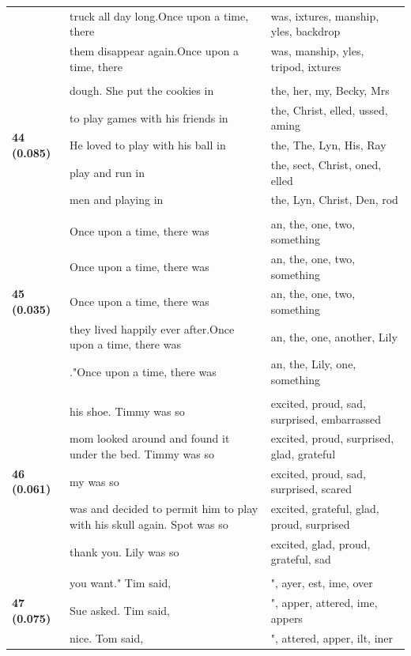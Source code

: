 \documentclass{article}
\theoremstyle{plain}
\theoremstyle{definition}
\theoremstyle{remark}
\begin{document}
\begin{longtable}{|p{}|p{}|p{}|}
& truck all day long.Once upon a time, there & was, ixtures, manship, yles,  backdrop \\
& them disappear again.Once upon a time, there & was, manship, yles,  tripod, ixtures \\
& & \\
\multirow{5}{*}{\textbf{44 (0.085)}} & dough. She put the cookies in & the,  her,  my,  Becky,  Mrs \\
& to play games with his friends in & the, Christ, elled, ussed, aming \\
& He loved to play with his ball in & the, The,  Lyn, His, Ray \\
& play and run in & the, sect, Christ, oned, elled \\
& men and playing in & the,  Lyn, Christ, Den, rod \\
& & \\
\multirow{5}{*}{\textbf{45 (0.035)}} & Once upon a time, there was & an,  the,  one,  two,  something \\
& Once upon a time, there was & an,  the,  one,  two,  something \\
& Once upon a time, there was & an,  the,  one,  two,  something \\
& they lived happily ever after.Once upon a time, there was & an,  the,  one,  another,  Lily \\
& ."Once upon a time, there was & an,  the,  Lily,  one,  something \\
& & \\
\multirow{5}{*}{\textbf{46 (0.061)}} & his shoe. Timmy was so & excited,  proud,  sad,  surprised,  embarrassed \\
& mom looked around and found it under the bed. Timmy was so & excited,  proud,  surprised,  glad,  grateful \\
& my was so & excited,  proud,  sad,  surprised,  scared \\
& was and decided to permit him to play with his skull again. Spot was so & excited,  grateful,  glad,  proud,  surprised \\
& thank you. Lily was so & excited,  glad,  proud,  grateful,  sad \\
& & \\
\multirow{5}{*}{\textbf{47 (0.075)}} & you want." Tim said, & ", ayer, est, ime, over \\
& Sue asked. Tim said, & ", apper, attered, ime, appers \\
& nice. Tom said, & ", attered, apper, ilt, iner \\

\end{longtable}
\end{document}
